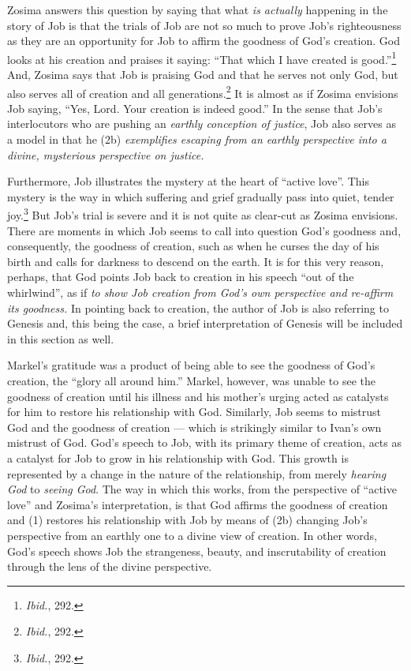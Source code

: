 Zosima answers this question by saying that what \emph{is actually} happening in the story of Job is that the trials of Job are not so much to prove Job's righteousness as they are an opportunity for Job to affirm the goodness of God's creation. God looks at his creation and praises it saying: ``That which I have created is good.''\footnote{\emph{Ibid.}, 292.} And, Zosima says that Job is praising God and that he serves not only God, but also serves all of creation and all generations.\footnote{\emph{Ibid.}, 292.} It is almost as if Zosima envisions Job saying, ``Yes, Lord. Your creation is indeed good.'' In the sense that Job's interlocutors who are pushing an \emph{earthly conception of justice}, Job also serves as a model in that he (2b) \emph{exemplifies escaping from an earthly perspective into a divine, mysterious perspective on justice.}

Furthermore, Job illustrates the mystery at the heart of ``active love''. This mystery is the way in which suffering and grief gradually pass into quiet, tender joy.\footnote{\emph{Ibid.}, 292.} But Job's trial is severe and it is not quite as clear-cut as Zosima envisions. There are moments in which Job seems to call into question God's goodness and, consequently, the goodness of creation, such as when he curses the day of his birth and calls for darkness to descend on the earth. It is for this very reason, perhaps, that God points Job back to creation in his speech ``out of the whirlwind'', as if \emph{to show Job creation from God's own perspective and re-affirm its goodness.} In pointing back to creation, the author of Job is also referring to Genesis and, this being the case, a brief interpretation of Genesis will be included in this section as well.

Markel's gratitude was a product of being able to see the goodness of God's creation, the ``glory all around him.'' Markel, however, was unable to see the goodness of creation until his illness and his mother's urging acted as catalysts for him to restore his relationship with God. Similarly, Job seems to mistrust God and the goodness of creation --- which is strikingly similar to Ivan's own mistrust of God. God's speech to Job, with its primary theme of creation, acts as a catalyst for Job to grow in his relationship with God. This growth is represented by a change in the nature of the relationship, from merely \emph{hearing God} to \emph{seeing God}. The way in which this works, from the perspective of ``active love'' and Zosima's interpretation, is that God affirms the goodness of creation and (1) restores his relationship with Job by means of (2b) changing Job's perspective from an earthly one to a divine view of creation. In other words, God's speech shows Job the strangeness, beauty, and inscrutability of creation through the lens of the divine perspective.

